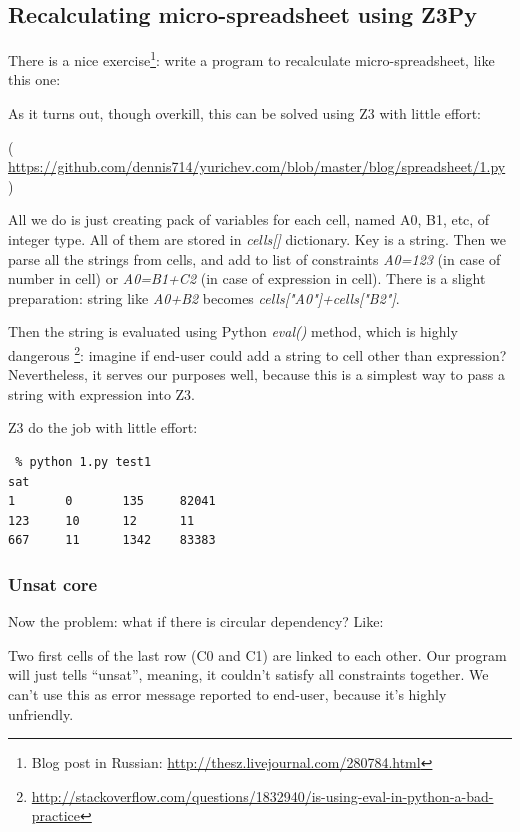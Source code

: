 \subsection{Recalculating micro-spreadsheet using Z3Py}

There is a nice exercise\footnote{Blog post in Russian: \url{http://thesz.livejournal.com/280784.html}}:
write a program to recalculate micro-spreadsheet, like this one:



As it turns out, though overkill, this can be solved using Z3 with little effort:



( \url{https://github.com/dennis714/yurichev.com/blob/master/blog/spreadsheet/1.py} )

All we do is just creating pack of variables for each cell, named A0, B1, etc, of integer type.
All of them are stored in \textit{cells[]} dictionary.
Key is a string.
Then we parse all the strings from cells, and add to list of constraints \textit{A0=123}
(in case of number in cell) or \textit{A0=B1+C2} (in case of expression in cell).
There is a slight preparation: string like \textit{A0+B2} becomes \textit{cells["A0"]+cells["B2"]}.

Then the string is evaluated using Python \textit{eval()} method,
which is highly dangerous
\footnote{\url{http://stackoverflow.com/questions/1832940/is-using-eval-in-python-a-bad-practice}}:
imagine if end-user could add a string to cell other than expression?
Nevertheless, it serves our purposes well, because this is a simplest way to pass a string with expression into Z3.

Z3 do the job with little effort:

\begin{lstlisting}
 % python 1.py test1
sat
1       0       135     82041
123     10      12      11
667     11      1342    83383
\end{lstlisting}

\subsubsection{Unsat core}

Now the problem: what if there is circular dependency? Like:



Two first cells of the last row (C0 and C1) are linked to each other.
Our program will just tells ``unsat'', meaning, it couldn't satisfy all constraints together.
We can't use this as error message reported to end-user, because it's highly unfriendly.

